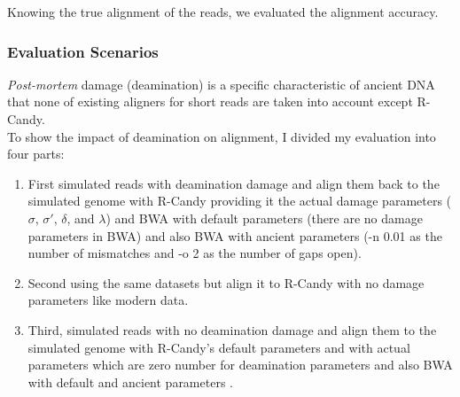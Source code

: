 \documentclass[11pt,a4paper]{report}
\begin{document}
Knowing the true alignment of the reads, we evaluated the alignment accuracy.\\ 



\subsubsection{Evaluation Scenarios}


\emph{Post-mortem} damage (deamination) is a specific characteristic of ancient DNA that none of existing aligners for short
reads are taken into account except R-Candy.\\

To show the impact of deamination on alignment, I divided my evaluation into four parts:

\begin{enumerate}
 
 \item First simulated reads with deamination damage and align them back to the simulated genome with R-Candy providing it the actual damage
parameters ( $ \sigma $, $ \sigma\prime$, $\delta$,  and $\lambda$) and BWA with default parameters (there are 
no damage parameters in BWA) and also BWA with ancient parameters (-n 0.01 as the number of mismatches and 
-o 2 as the number of  gaps open).

 \item Second using the same datasets but align it to R-Candy with no damage parameters like modern data.
 
 \item Third, simulated reads with no deamination damage and align them to the simulated genome with R-Candy's default parameters and with actual parameters which are zero number for deamination parameters and also BWA with default and ancient parameters . 

\end{enumerate}
\end{document}
